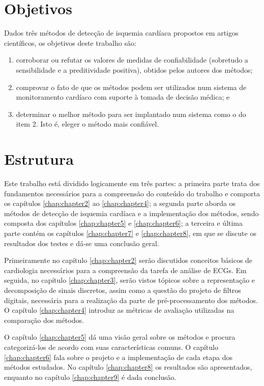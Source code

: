 \section{Objetivos}
Dados três métodos de detecção de isquemia cardíaca propostos em artigos científicos, os objetivos deste trabalho são:
\begin{enumerate}
    \item corroborar ou refutar os valores de medidas de confiabilidade (sobretudo a sensibilidade e a preditividade positiva), obtidos pelos autores dos métodos;
    \item comprovar o fato de que os métodos podem ser utilizados num sistema de monitoramento cardíaco com suporte à tomada de decisão médica; e
    \item determinar o melhor método para ser implantado num sistema como o do item 2. Isto é, eleger o método mais confiável.
\end{enumerate}


\section{Estrutura}
Este trabalho está dividido logicamente em três partes: a primeira parte trata dos fundamentos necessários para a compreensão do conteúdo do trabalho e comporta os capítulos \ref{chap:chapter2} ao \ref{chap:chapter4}; a segunda parte aborda os métodos de detecção de isquemia cardíaca e a implementação dos métodos, sendo composta dos capítulos \ref{chap:chapter5} e \ref{chap:chapter6}; a terceira e última parte contém os capítulos \ref{chap:chapter7} e \ref{chap:chapter8}, em que se discute os resultados dos testes e dá-se uma conclusão geral.

Primeiramente no capítulo \ref{chap:chapter2} serão discutidos conceitos básicos de cardiologia necessários para a compreensão da tarefa de análise de ECGs. Em seguida, no capítulo \ref{chap:chapter3}, serão vistos tópicos sobre a representação e decomposição de sinais discretos, assim como a questão do projeto de filtros digitais, necessária para a realização da parte de pré-processamento dos métodos. O capítulo \ref{chap:chapter4} introduz as métricas de avaliação utilizadas na comparação dos métodos.

O capítulo \ref{chap:chapter5} dá uma visão geral sobre os métodos e procura categorizá-los de acordo com suas características comuns. O capítulo \ref{chap:chapter6} fala sobre o projeto e a implementação de cada etapa dos métodos estudados. No capítulo \ref{chap:chapter8} os resultados são apresentados, enquanto no capítulo \ref{chap:chapter9} é dada conclusão.